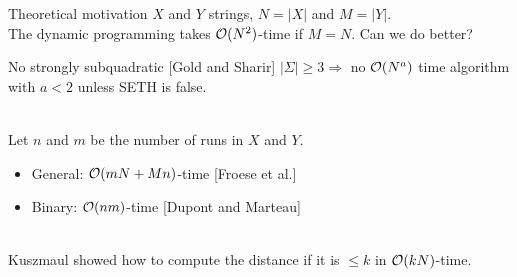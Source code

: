 \begin{frame}{Theoretical motivation}
    $X$ and $Y$ strings, $N=|X|$ and $M=|Y|$.\\
    The dynamic programming takes $\mathcal{O}(N^2)$-time if $M=N$. Can we do better?\pause
    \begin{block}{No strongly subquadratic [Gold and Sharir]}
    $|\Sigma| \geq 3 \Rightarrow $ no $\mathcal{O}(N^{a})$ time algorithm with $a<2$ unless SETH is false.
    \end{block}\pause
    
    \\
    Let $n$ and $m$ be the number of runs in $X$ and $Y$. \pause
    \begin{itemize}
    \item General: $\mathcal{O}(mN+Mn)$-time [Froese et al.] \pause
    \item Binary: $\mathcal{O}(nm)$-time [Dupont and Marteau] \pause
    \end{itemize} \hfill
    
    \\
    Kuszmaul showed how to compute the distance if it is $\leq k$ in $\mathcal{O}(kN)$-time.
    \end{frame}
    
    